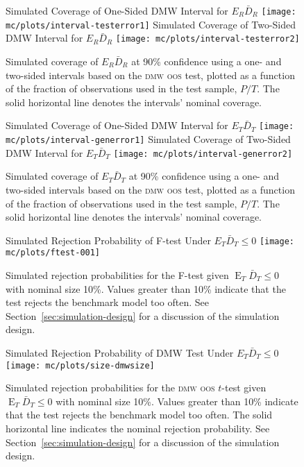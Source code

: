 \documentclass[11pt]{article}
\DeclareMathOperator{\E}{E}
\newcommand{\oosA}{\bar{D}_{R}}
\newcommand{\oosB}{\bar{D}_{T}}
\begin{document}
\clearpage
\begin{figure}
\centering
\large{Simulated Coverage of One-Sided DMW Interval for $E_R\oosA$}
\texttt{[image: mc/plots/interval-testerror1]}
\large{Simulated Coverage of Two-Sided DMW Interval for $E_R\oosA$}
\texttt{[image: mc/plots/interval-testerror2]}
\caption{Simulated coverage of $E_R \oosA$ at 90\% confidence using a
  one- and two-sided intervals based on the \protect\textsc{dmw}
  \protect\textsc{oos} test, plotted as a function of the fraction of
  observations used in the test sample, $P/T$.  The solid horizontal
  line denotes the intervals' nominal coverage.}
 \label{fig:interval-R}
\end{figure}
\clearpage
\begin{figure}
\centering
\large{Simulated Coverage of One-Sided DMW Interval for $E_T\oosB$}
\texttt{[image: mc/plots/interval-generror1]}
\large{Simulated Coverage of Two-Sided DMW Interval for $E_T\oosB$}
\texttt{[image: mc/plots/interval-generror2]}
\caption{Simulated coverage of $E_T \oosB$ at 90\% confidence using a
  one- and two-sided intervals based on the \protect\textsc{dmw}
  \protect\textsc{oos} test, plotted as a function of the fraction of
  observations used in the test sample, $P/T$.  The solid horizontal
  line denotes the intervals' nominal coverage.}
\label{fig:interval-T}
\end{figure}
\clearpage

\begin{figure}
  \centering
\large{Simulated Rejection Probability of F-test Under $E_T
      \oosB \leq 0$}
  \texttt{[image: mc/plots/ftest-001]}
  \caption{Simulated rejection probabilities for the F-test given
    $\E_T \oosB \leq 0$ with nominal size 10\%.  Values greater than
    10\% indicate that the test rejects the benchmark model too often.
    See Section~\ref{sec:simulation-design} for a discussion of the
    simulation design.}
  \label{fig:ftest}
\end{figure}
\clearpage
\begin{figure}
  \centering
  \large{Simulated Rejection Probability of DMW Test Under $E_T
      \oosB \leq 0$}
  \texttt{[image: mc/plots/size-dmwsize]}  
  \caption{Simulated rejection probabilities for the \protect\textsc{dmw}
    \protect\textsc{oos} $t$-test given $\E_T \oosB \leq 0$ with nominal
    size 10\%.  Values greater than 10\% indicate that the test
    rejects the benchmark model too often.  The solid horizontal line
    indicates the nominal rejection probability.  See
    Section~\ref{sec:simulation-design} for a discussion of the
    simulation design.}
  \label{fig:ttest-size}
\end{figure}
\end{document}

